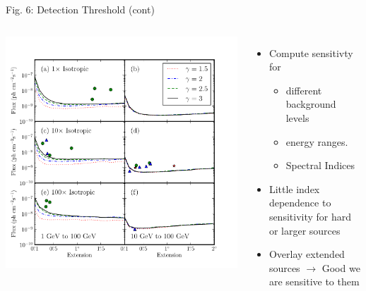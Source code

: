 \documentclass[12pt]{beamer}
\begin{document}
\begin{frame}{Fig. 6: Detection Threshold (cont)}
  \begin{columns}
    \includegraphics[scale=0.45]{plots/all_sensitivity_color.pdf}
    \begin{itemize}
      \item Compute sensitivty for 
    \begin{itemize}
      \item different background levels
      \item energy ranges.
      \item Spectral Indices
    \end{itemize}
    \item Little index dependence to sensitivity 
      for hard or larger sources
      \item Overlay extended sources 
      $\rightarrow$ Good we are sensitive to them
    \end{itemize}
  \end{columns}
\end{frame}
\end{document}
